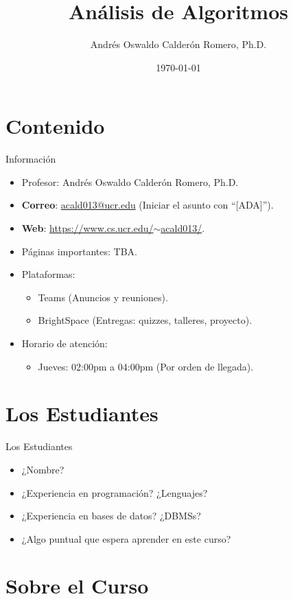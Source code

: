 \documentclass{beamer}
\title{Análisis de Algoritmos}
\author{Andrés Oswaldo Calderón Romero, Ph.D.}
\date{\today}
\begin{document}
\frame{\titlepage}

\section{Contenido}

\begin{frame}{Información}
\begin{itemize}
    \item Profesor: Andrés Oswaldo Calderón Romero, Ph.D.
    \item \textbf{Correo}: \href{mailto:acald013@ucr.edu}{acald013@ucr.edu} (Iniciar el asunto con ``[ADA]'').
    \item \textbf{Web}: \href{https://www.cs.ucr.edu/~acald013/}{https://www.cs.ucr.edu/$\sim$acald013/}.
    \item Páginas importantes: TBA.
    \item Plataformas: 
    \begin{itemize}
        \item Teams (Anuncios y reuniones).
        \item BrightSpace (Entregas: quizzes, talleres, proyecto).
    \end{itemize}
    \item Horario de atención: 
    \begin{itemize}
        \item Jueves: 02:00pm a 04:00pm (Por orden de llegada).
    \end{itemize}
\end{itemize}
\end{frame}

\section{Los Estudiantes}

\begin{frame}{Los Estudiantes}
\begin{itemize}
    \item ¿Nombre? 
    \item ¿Experiencia en programación? ¿Lenguajes? 
    \item ¿Experiencia en bases de datos? ¿DBMSs?
    \item ¿Algo puntual que espera aprender en este curso?
\end{itemize}
\end{frame}

\section{Sobre el Curso}
\end{document}
